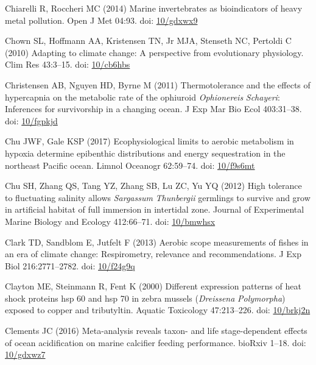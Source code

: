 \documentclass[a4paper,10pt, oneside]{memoir}
\begin{document}
\leavevmode\hypertarget{ref-Chiarelli2014}{}%
Chiarelli R, Roccheri MC (2014) Marine invertebrates as bioindicators of heavy metal pollution. Open J Met 04:93. doi: \href{https://doi.org/10/gdxwx9}{10/gdxwx9}

\leavevmode\hypertarget{ref-Chown2010}{}%
Chown SL, Hoffmann AA, Kristensen TN, Jr MJA, Stenseth NC, Pertoldi C (2010) Adapting to climate change: A perspective from evolutionary physiology. Clim Res 43:3--15. doi: \href{https://doi.org/10/cb6hbs}{10/cb6hbs}

\leavevmode\hypertarget{ref-Christensen2011}{}%
Christensen AB, Nguyen HD, Byrne M (2011) Thermotolerance and the effects of hypercapnia on the metabolic rate of the ophiuroid \emph{Ophionereis} \emph{Schayeri}: Inferences for survivorship in a changing ocean. J Exp Mar Bio Ecol 403:31--38. doi: \href{https://doi.org/10/fgpkjd}{10/fgpkjd}

\leavevmode\hypertarget{ref-Chu2017}{}%
Chu JWF, Gale KSP (2017) Ecophysiological limits to aerobic metabolism in hypoxia determine epibenthic distributions and energy sequestration in the northeast Pacific ocean. Limnol Oceanogr 62:59--74. doi: \href{https://doi.org/10/f9s6mt}{10/f9s6mt}

\leavevmode\hypertarget{ref-Chu2012}{}%
Chu SH, Zhang QS, Tang YZ, Zhang SB, Lu ZC, Yu YQ (2012) High tolerance to fluctuating salinity allows \emph{Sargassum} \emph{Thunbergii} germlings to survive and grow in artificial habitat of full immersion in intertidal zone. Journal of Experimental Marine Biology and Ecology 412:66--71. doi: \href{https://doi.org/10/bmwhsx}{10/bmwhsx}

\leavevmode\hypertarget{ref-Clark2013}{}%
Clark TD, Sandblom E, Jutfelt F (2013) Aerobic scope measurements of fishes in an era of climate change: Respirometry, relevance and recommendations. J Exp Biol 216:2771--2782. doi: \href{https://doi.org/10/f24g9q}{10/f24g9q}

\leavevmode\hypertarget{ref-Clayton2000}{}%
Clayton ME, Steinmann R, Fent K (2000) Different expression patterns of heat shock proteins hsp 60 and hsp 70 in zebra mussels (\emph{Dreissena} \emph{Polymorpha}) exposed to copper and tributyltin. Aquatic Toxicology 47:213--226. doi: \href{https://doi.org/10/brkj2n}{10/brkj2n}

\leavevmode\hypertarget{ref-Clements2016}{}%
Clements JC (2016) Meta-analysis reveals taxon- and life stage-dependent effects of ocean acidification on marine calcifier feeding performance. bioRxiv 1--18. doi: \href{https://doi.org/10/gdxwz7}{10/gdxwz7}
\end{document}
